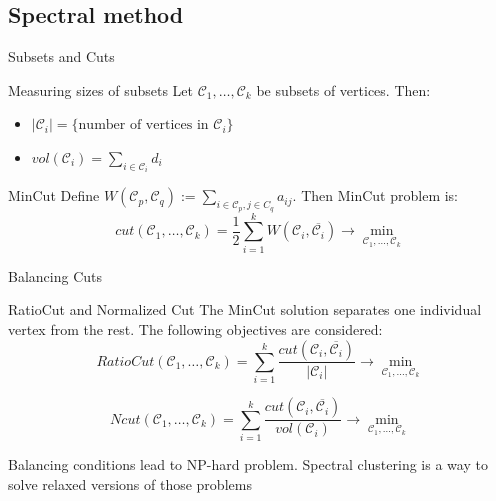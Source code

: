 \documentclass{beamer}
\theoremstyle{definition}
\theoremstyle{plain}
\theoremstyle{remark}
\begin{document}
		\subsection{Spectral method}
			\begin{frame}{Subsets and Cuts}
				\begin{block}{Measuring sizes of subsets}
					Let $\mathcal{C}_{1},\dots,\mathcal{C}_{k}$ be subsets of vertices. Then:
					\begin{itemize}
						\item $|\mathcal{C}_{i}| = \{\text{number of vertices in $\mathcal{C}_{i}$}\}$
						\item $vol(\mathcal{C}_{i}) = \sum \limits_{i \in \mathcal{C}_{i}}d_{i}$
					\end{itemize}
				\end{block}
				\begin{block}{MinCut}
					Define $W(\mathcal{C}_p,\mathcal{C}_q):= \sum \limits_{i \in \mathcal{C}_p,j \in C_q}  a_{ij}.$ Then MinCut problem is:
\[
cut(\mathcal{C}_1,\dots,\mathcal{C}_k) = \frac{1}{2}\sum\limits_{i=1}^kW(\mathcal{C}_i,\overline{\mathcal{C}_i}) \rightarrow \min \limits_{\mathcal{C}_1,\dots,\mathcal{C}_k}
\]
				\end{block}
			\end{frame}		
		\begin{frame}{Balancing Cuts}
				\begin{block}{RatioCut and Normalized Cut}
					The MinCut solution separates one individual vertex from the rest. The following objectives are considered:
\[
RatioCut(\mathcal{C}_1,\dots,\mathcal{C}_k) = \sum \limits_{i=1}^k \frac{cut(\mathcal{C}_i,\overline{\mathcal{C}_i})}{|\mathcal{C}_{i}|} \rightarrow \min \limits_{\mathcal{C}_1,\dots,\mathcal{C}_k}
\]

\[
Ncut(\mathcal{C}_1,\dots,\mathcal{C}_k)= \sum \limits_{i=1}^k \frac{cut(\mathcal{C}_i,\overline{\mathcal{C}_i})}{vol(\mathcal{C}_{i})} \rightarrow \min \limits_{\mathcal{C}_1,\dots,\mathcal{C}_k}
\]
			\end{block}
				Balancing conditions lead to NP-hard problem. Spectral clustering is a way to solve relaxed versions of those problems
			\end{frame}
\end{document}
